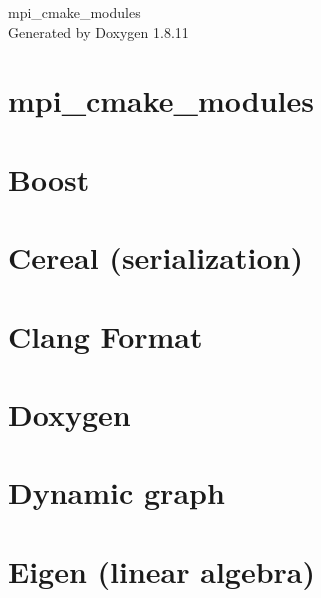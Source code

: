 \documentclass[twoside]{book}
\newcommand{\+}{\discretionary{\mbox{\scriptsize$\hookleftarrow$}}{}{}}
\newcommand{\clearemptydoublepage}{%
  \newpage{\pagestyle{empty}\cleardoublepage}%
}
\begin{document}
\hypersetup{pageanchor=false,
             bookmarksnumbered=true,
             pdfencoding=unicode
            }
\begin{titlepage}
\vspace*{7cm}
\begin{center}%
{\Large mpi\+\_\+cmake\+\_\+modules }\\
\vspace*{1cm}
{\large Generated by Doxygen 1.8.11}\\
\end{center}
\end{titlepage}
\clearemptydoublepage
\tableofcontents
\clearemptydoublepage
{}
\hypersetup{pageanchor=true}

\chapter{mpi\+\_\+cmake\+\_\+modules}
\label{index}\hypertarget{index}{}
\chapter{Boost}
\label{md_doc_boost}
\hypertarget{md_doc_boost}{}

\chapter{Cereal (serialization)}
\label{md_doc_cereal}
\hypertarget{md_doc_cereal}{}

\chapter{Clang Format}
\label{md_doc_clang_format}
\hypertarget{md_doc_clang_format}{}

\chapter{Doxygen}
\label{md_doc_doxygen}
\hypertarget{md_doc_doxygen}{}

\chapter{Dynamic graph}
\label{md_doc_dynamic_graph}
\hypertarget{md_doc_dynamic_graph}{}

\chapter{Eigen (linear algebra)}
\label{md_doc_eigen}
\hypertarget{md_doc_eigen}{}

\end{document}
